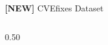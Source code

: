 \documentclass[aspectratio=169,10pt]{beamer}
\newcommand{\cmiss}[1]{\cellcolor{miss!25} #1}
\begin{document}
\begin{frame}{\textbf{[NEW]} CVEfixes Dataset }
\begin{columns}[T]
\begin{column}{0.50\textwidth}
\begin{center}
    \end{center}
  
\end{column}
\end{columns}
\end{frame}




  
\end{document}
